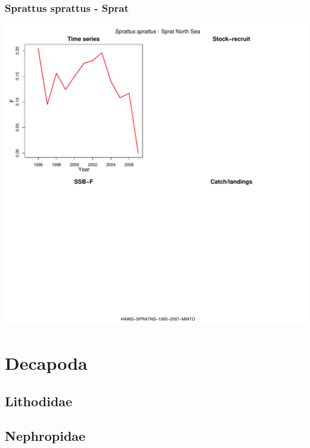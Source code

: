 \subsubsection{Sprattus sprattus - Sprat}
\begin{center}
\includegraphics[width=1.2\textwidth]{../R/figures/HAWG-SPRATNS-1995-2007-MINTO.pdf}
\end{center}

\section{Decapoda}

\subsection{Lithodidae}

\subsection{Nephropidae}

